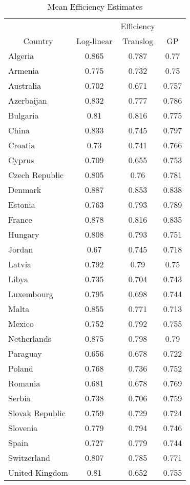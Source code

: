 \begin{table*}[!h]
\centering
\begin{tabular}{l|c|c|c}
  \multicolumn{1}{c}{} & \multicolumn{1}{c}{} & \multicolumn{1}{c}{Efficiency} & \multicolumn{1}{c}{} \\ 
   \cline{2-4}\multicolumn{1}{c}{Country} & \multicolumn{1}{c}{Log-linear} & \multicolumn{1}{c}{Translog} & \multicolumn{1}{c}{GP} \\ 
   \hline
\hline
Algeria & 0.865 & 0.787 & 0.77 \\ 
  Armenia & 0.775 & 0.732 & 0.75 \\ 
  Australia & 0.702 & 0.671 & 0.757 \\ 
  Azerbaijan & 0.832 & 0.777 & 0.786 \\ 
  Bulgaria & 0.81 & 0.816 & 0.775 \\ 
  China & 0.833 & 0.745 & 0.797 \\ 
  Croatia & 0.73 & 0.741 & 0.766 \\ 
  Cyprus & 0.709 & 0.655 & 0.753 \\ 
  Czech Republic & 0.805 & 0.76 & 0.781 \\ 
  Denmark & 0.887 & 0.853 & 0.838 \\ 
  Estonia & 0.763 & 0.793 & 0.789 \\ 
  France & 0.878 & 0.816 & 0.835 \\ 
  Hungary & 0.808 & 0.793 & 0.751 \\ 
  Jordan & 0.67 & 0.745 & 0.718 \\ 
  Latvia & 0.792 & 0.79 & 0.75 \\ 
  Libya & 0.735 & 0.704 & 0.743 \\ 
  Luxembourg & 0.795 & 0.698 & 0.744 \\ 
  Malta & 0.855 & 0.771 & 0.713 \\ 
  Mexico & 0.752 & 0.792 & 0.755 \\ 
  Netherlands & 0.875 & 0.798 & 0.79 \\ 
  Paraguay & 0.656 & 0.678 & 0.722 \\ 
  Poland & 0.768 & 0.736 & 0.752 \\ 
  Romania & 0.681 & 0.678 & 0.769 \\ 
  Serbia & 0.738 & 0.706 & 0.759 \\ 
  Slovak Republic & 0.759 & 0.729 & 0.724 \\ 
  Slovenia & 0.779 & 0.794 & 0.746 \\ 
  Spain & 0.727 & 0.779 & 0.744 \\ 
  Switzerland & 0.807 & 0.785 & 0.771 \\ 
  United Kingdom & 0.81 & 0.652 & 0.755 \\ 
   \hline
\end{tabular}
\caption{Mean Efficiency Estimates} 
\label{tab:EfficiencyEstimates}
\end{table*}
